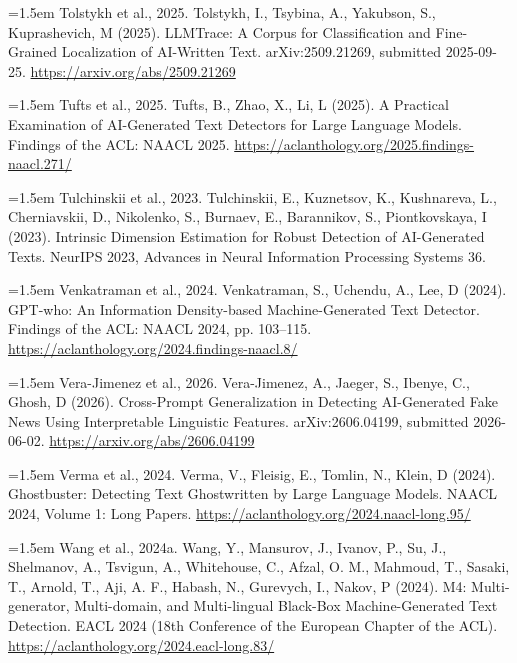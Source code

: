 \documentclass[11pt,a4paper]{article}
\renewcommand{\_}{\textunderscore\allowbreak}
\begin{document}
\noindent\hangindent=1.5em Tolstykh et al., 2025. Tolstykh, I., Tsybina, A., Yakubson, S., Kuprashevich, M (2025). LLMTrace: A Corpus for Classification and Fine-Grained Localization of AI-Written Text. arXiv:2509.21269, submitted 2025-09-25. \url{https://arxiv.org/abs/2509.21269}\par\smallskip

\noindent\hangindent=1.5em Tufts et al., 2025. Tufts, B., Zhao, X., Li, L (2025). A Practical Examination of AI-Generated Text Detectors for Large Language Models. Findings of the ACL: NAACL 2025. \url{https://aclanthology.org/2025.findings-naacl.271/}\par\smallskip

\noindent\hangindent=1.5em Tulchinskii et al., 2023. Tulchinskii, E., Kuznetsov, K., Kushnareva, L., Cherniavskii, D., Nikolenko, S., Burnaev, E., Barannikov, S., Piontkovskaya, I (2023). Intrinsic Dimension Estimation for Robust Detection of AI-Generated Texts. NeurIPS 2023, Advances in Neural Information Processing Systems 36.\par\smallskip

\noindent\hangindent=1.5em Venkatraman et al., 2024. Venkatraman, S., Uchendu, A., Lee, D (2024). GPT-who: An Information Density-based Machine-Generated Text Detector. Findings of the ACL: NAACL 2024, pp. 103–115. \url{https://aclanthology.org/2024.findings-naacl.8/}\par\smallskip

\noindent\hangindent=1.5em Vera-Jimenez et al., 2026. Vera-Jimenez, A., Jaeger, S., Ibenye, C., Ghosh, D (2026). Cross-Prompt Generalization in Detecting AI-Generated Fake News Using Interpretable Linguistic Features. arXiv:2606.04199, submitted 2026-06-02. \url{https://arxiv.org/abs/2606.04199}\par\smallskip

\noindent\hangindent=1.5em Verma et al., 2024. Verma, V., Fleisig, E., Tomlin, N., Klein, D (2024). Ghostbuster: Detecting Text Ghostwritten by Large Language Models. NAACL 2024, Volume 1: Long Papers. \url{https://aclanthology.org/2024.naacl-long.95/}\par\smallskip

\noindent\hangindent=1.5em Wang et al., 2024a. Wang, Y., Mansurov, J., Ivanov, P., Su, J., Shelmanov, A., Tsvigun, A., Whitehouse, C., Afzal, O. M., Mahmoud, T., Sasaki, T., Arnold, T., Aji, A. F., Habash, N., Gurevych, I., Nakov, P (2024). M4: Multi-generator, Multi-domain, and Multi-lingual Black-Box Machine-Generated Text Detection. EACL 2024 (18th Conference of the European Chapter of the ACL). \url{https://aclanthology.org/2024.eacl-long.83/}\par\smallskip
\end{document}
